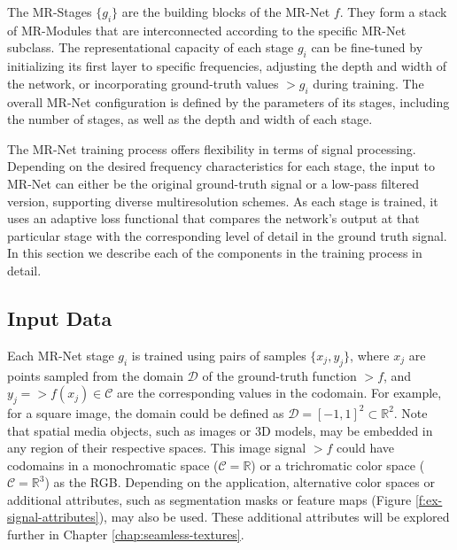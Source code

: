 The MR-Stages $\{g_i\}$ are the building blocks of the MR-Net $f$. They form a stack of MR-Modules that are interconnected according to the specific MR-Net subclass. The representational capacity of each stage $g_i$ can be fine-tuned by initializing its first layer to specific frequencies, adjusting the depth and width of the network, or incorporating ground-truth values $\gt{g}_i$ during training. The overall MR-Net configuration is defined by the parameters of its stages, including the number of stages, as well as the depth and width of each stage.

The MR-Net training process offers flexibility in terms of signal processing. Depending on the desired frequency characteristics for each stage, the input to MR-Net can either 
be the original ground-truth signal or a low-pass filtered version, supporting diverse multiresolution schemes. As each stage is trained, it uses an adaptive loss functional that compares the network's output at that particular stage with the corresponding level of detail in the ground truth signal. In this section we describe each of the components in the training process in detail.

\subsection{Input Data}

Each MR-Net stage \( g_i \) is trained using pairs of samples \(\{x_j, y_j\}\), where \( x_j \) are points sampled from the domain \(\mathcal{D}\) of the ground-truth function \(\gt{f}\), and \( y_j = \gt{f}(x_j) \in \mathcal{C} \) are the corresponding values in the codomain. For example, for a square image, the domain could be defined as \(\mathcal{D} = [-1, 1]^2 \subset \mathbb{R}^{2}\). Note that spatial media objects, such as images or 3D models, may be embedded in any region of their respective spaces. This image signal \(\gt{f}\) could have codomains in a monochromatic space (\(\mathcal{C} = \mathbb{R}\)) or a trichromatic color space (\(\mathcal{C} = \mathbb{R}^3\)) as the RGB. Depending on the application, alternative color spaces or additional attributes, such as segmentation masks or feature maps (Figure \ref{f:ex-signal-attributes}), may also be used. These additional attributes will be explored further in Chapter \ref{chap:seamless-textures}. 


